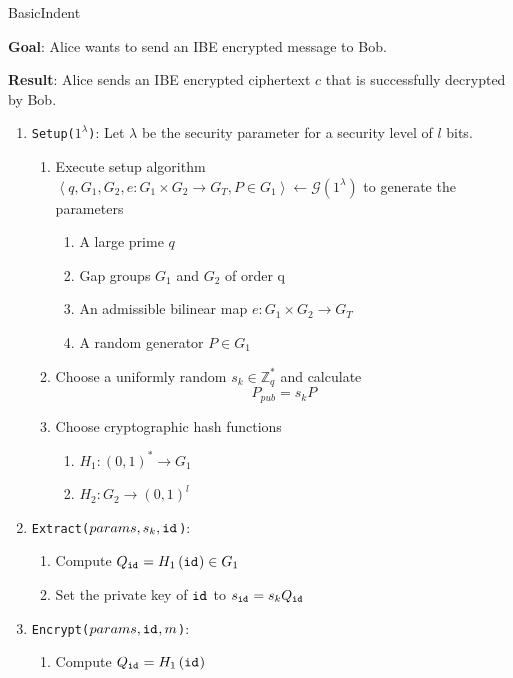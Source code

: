 \begin{algorithm}
\caption{BasicIndent~\cite{art:BonehF01}}
\label{alg:basic_indent}
 \textbf{Goal}: Alice wants to send an IBE encrypted message to Bob.
 
 \textbf{Result}: Alice sends an IBE encrypted ciphertext $c$ that is successfully decrypted by Bob.
 \begin{enumerate}
  \item \texttt{Setup($1^{\lambda}$)}: Let $\lambda$ be the security parameter for a security level of $l$ bits.
  \begin{enumerate}
   \item Execute setup algorithm $\left< q, G_1, G_2, e: G_1 \times G_2 \rightarrow G_T, P \in G_1 \right> \leftarrow \mathcal{G} \left( 1^{\lambda} \right)$ to generate the parameters
    \begin{enumerate}
     \item A large prime $q$
     \item Gap groups $G_1$ and $G_2$ of order q
     \item An admissible bilinear map $e: G_1 \times G_2 \rightarrow G_T$
     \item A random generator $P \in G_1$
   \end{enumerate}
   \item Choose a uniformly random $s_k \in \mathbb{Z}^{*}_q$ and calculate
   \begin{equation*}
    P_{pub} = s_k P
   \end{equation*}
   \item Choose cryptographic hash functions
    \begin{enumerate}
     \item $H_1: \left( 0,1  \right)^* \rightarrow G_1$
     \item $H_2: G_2 \rightarrow \left( 0,1 \right)^l$
    \end{enumerate}
  \end{enumerate}
  \item \texttt{Extract($params, s_k, \mathtt{id}_{}$)}:
   \begin{enumerate}
    \item Compute $Q_{\mathtt{id}_{}} = H_1 \left( \mathtt{id}_{} \right) \in G_1$
    \item Set the private key of $\mathtt{id}_{}$ to $s_{\mathtt{id}_{}} = s_k Q_{\mathtt{id}_{}}$
   \end{enumerate}
   \item \texttt{Encrypt($params, \mathtt{id}_{}, m$)}:
   \begin{enumerate}
    \item Compute $Q_{\mathtt{id}_{}} = H_1 \left( \mathtt{id}_{} \right)$

\end{enumerate}
\end{enumerate}
\end{algorithm}

